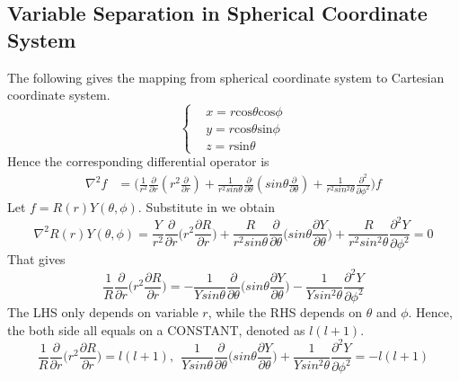 \documentclass[25pt]{article}
\begin{document}
\subsection{Variable Separation in Spherical Coordinate System }
The following gives the mapping from spherical coordinate system to Cartesian coordinate system.
\begin{equation}
\left\{
\begin{aligned}
    &x = r\text{cos}\theta \text{cos} \phi \\
    &y = r\text{cos}\theta \text{sin} \phi \\
    &z = r\text{sin}\theta
\end{aligned}
\right.
\end{equation}
Hence the corresponding differential operator is
\begin{equation}
\begin{aligned}
    \nabla^2  f &= \bigg(\frac{1}{r^2}\frac{\partial}{\partial r}(r^2 \frac{\partial}{\partial r}) + \frac{1}{r^2sin\theta}\frac{\partial}{\partial \theta} (sin\theta \frac{\partial}{\partial \theta} ) + \frac{1}{r^2 sin^2\theta} \frac{\partial^2}{\partial \phi^2}\bigg) f
\end{aligned}
\end{equation}
Let $f = R(r) Y(\theta, \phi)$. Substitute in we obtain
\begin{equation}
    \nabla^2R(r)Y(\theta, \phi) = \frac{Y}{r^2} \frac{\partial}{\partial r}\bigg(r^2 \frac{\partial R}{\partial r}\bigg) + \frac{R}{r^2 sin\theta} \frac{\partial}{\partial \theta} \bigg(sin\theta \frac{\partial Y}{\partial \theta}\bigg) + \frac{R}{r^2 sin^2\theta}\frac{\partial^2 Y}{\partial \phi^2} = 0
\end{equation}
That gives
\begin{equation}
    \frac{1}{R}\frac{\partial}{\partial r}\bigg(r^2 \frac{\partial R}{\partial r}\bigg) = -\frac{1}{Y sin\theta}\frac{\partial}{\partial \theta}\bigg(sin\theta \frac{\partial Y}{\partial \theta}\bigg) - \frac{1}{Y sin^2 \theta} \frac{\partial^2 Y}{\partial \phi^2} 
\end{equation}
The LHS only depends on variable $r$, while the RHS depends on $\theta$ and $\phi$. Hence, the both side all equals on a CONSTANT, denoted as $l(l+1)$.
\begin{equation}
    \frac{1}{R}\frac{\partial}{\partial r}\bigg(r^2 \frac{\partial R}{\partial r} \bigg) = l(l+1),~~ \frac{1}{Y sin\theta} \frac{\partial}{\partial \theta} \bigg(sin\theta \frac{\partial Y}{\partial \theta} \bigg) + \frac{1}{Y sin^2 \theta} \frac{\partial^2 Y}{\partial \phi^2} = -l(l+1)
\end{equation}
\end{document}
